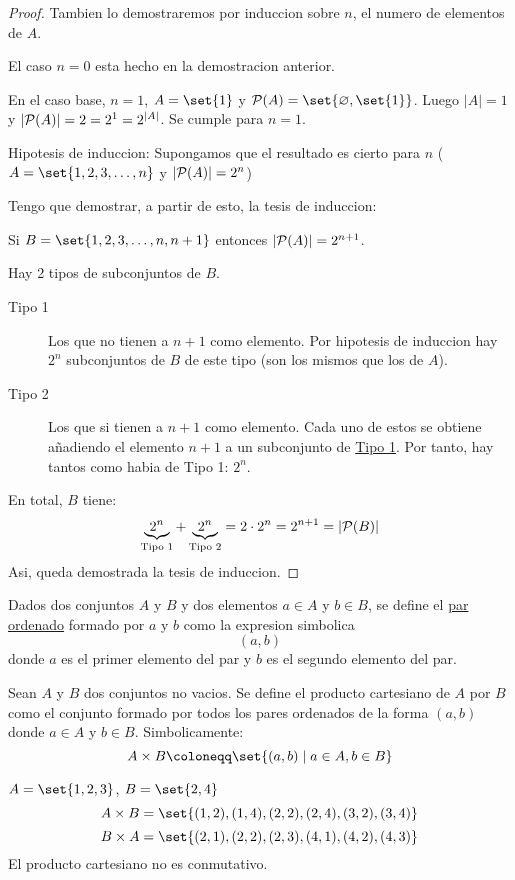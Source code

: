 \begin{proof}
	Tambien lo demostraremos por induccion sobre \(n \), el numero de elementos de \(A \).

	El caso \(n = 0 \) esta hecho en la demostracion anterior.

	En el caso base, \(n = 1\), \(A = \set{1 }\) y \(\mathcal{\MakeUppercase{p}}(A) = \set{\varnothing, \set{1}}\). Luego \(|A| = 1 \) y \(|\mathcal{\MakeUppercase{p}}(A)| = 2 = 2^{1} = 2^{|A| } \). Se cumple para \(n = 1 \).

	Hipotesis de induccion: Supongamos que el resultado es cierto para \(n \) (\(A = \set{1,2,3,\ldots,n}\) y \(|\mathcal{\MakeUppercase{p}}(A)| = 2^{n}  \))

	Tengo que demostrar, a partir de esto, la tesis de induccion:

	Si \(B = \set{1,2,3,\ldots,n,n+1}\) entonces \(|\mathcal{\MakeUppercase{p}}(A)| = 2^{n+1} \).

	Hay 2 tipos de subconjuntos de \(B \).
	\begin{description}
		\item[Tipo 1] Los que no tienen a \(n+1 \) como elemento. Por hipotesis de induccion hay \(2^{n } \) subconjuntos de \(B \) de este tipo (son los mismos que los de \(A \)).
		\item[Tipo 2] Los que si tienen a \(n+1 \) como elemento. Cada uno de estos se obtiene añadiendo el elemento \(n+1\) a un subconjunto de \underline{Tipo 1}. Por tanto, hay tantos como habia de Tipo 1: \(2^{n} \).
	\end{description}
	En total, \(B \) tiene:
	\[
		\underbrace{2^{n}}_{\text{Tipo 1}} + \underbrace{2^{n}}_{\text{Tipo 2}} = 2 \cdot 2^{n} = 2^{n+1} = |\mathcal{\MakeUppercase{p}}(B)|
	\]
	Asi, queda demostrada la tesis de induccion.
\end{proof}

\begin{definition}
	Dados dos conjuntos \(A \) y \(B \) y dos elementos \(a \in  A\) y \(b \in B \), se define el \underline{par ordenado} formado por \(a \) y \(b \) como la expresion simbolica
	\[
		(a,b)
	\]
	donde \(a \) es el primer elemento del par y \(b \) es el segundo elemento del par.
\end{definition}

\begin{definition}
	Sean \(A \) y \(B \) dos conjuntos no vacios. Se define el producto cartesiano de \(A \) por \(B \) como el conjunto formado por todos los pares ordenados de la forma \((a,b )\) donde \(a \in A \) y \(b \in B \). Simbolicamente:
	\[
		A \times B \coloneqq \set{(a,b) \mid a \in A, b \in B}
	\]
\end{definition}
\begin{example}
	\(A = \set{1,2,3}\), \(B = \set{2,4}\)
	\[
		A \times B = \set{(1,2), (1,4), (2,2), (2,4), (3,2), (3,4)}
	\]
	\[
		B \times A = \set{(2,1), (2,2), (2,3), (4,1), (4,2), (4,3)}
	\]
	El producto cartesiano no es conmutativo.
\end{example}

